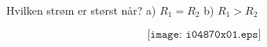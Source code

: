 

Hvilken strøm er størst når?
\vskip 10pt
a) $R_1=R_2$
\vskip 10pt
b) $R_1>R_2$
\vskip 10pt

$$\texttt{[image: i04870x01.eps]}$$




















